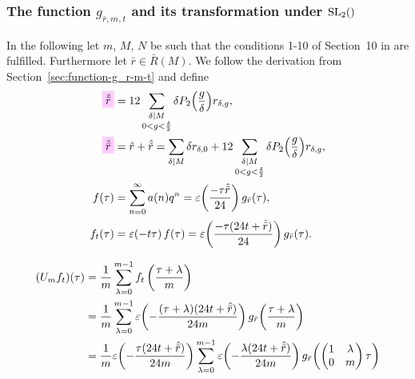 \documentclass{article}
\begin{document}
\subsubsection{The function $g_{\bar{r},m,t}$ and its transformation
  under $\SL2Z$}
\label{sec:function-g_rbar-m-t}

In the following let $m$, $M$, $N$ be such that the conditions 1-10 of
Section~10 in
\cite{Chen+Du+Zhao:FindingModularFunctionsRamanujan:2019} are
fulfilled.
Furthermore let $\bar{r}\in\bar{R}(M)$.
%
We follow the derivation from Section~\ref{sec:function-g_r-m-t} and
define
\begin{align}
  \defineNotation[rtilde^{}]{\sumdelta{\tilde{r}}}
  &=
  12 \sum_{\substack{\divides{\delta}{M}\\0 < g < \frac{\delta}{2}}}
           \delta P_2\Bigl(\frac{g}{\delta}\Bigr) r_{\delta,g},
  \notag\\
  \defineNotation[rbar^{}]{\sumdelta{\bar{r}}}
  &= \sumdelta{r} + \sumdelta{\tilde{r}}
  =
  \divisorsum{M} \delta r_{\delta,0}
  + 12 \sum_{\substack{\divides{\delta}{M}\\0 < g < \frac{\delta}{2}}}
           \delta P_2\Bigl(\frac{g}{\delta}\Bigr) r_{\delta,g},
  \notag\\
  f(\tau)
  &=
  \sum_{n=0}^\infty a(n) q^n
    =
    \unityPower{\frac{- \tau \sumdelta{\bar{r}}}{24}} g_{\bar{r}}(\tau),
  \notag\\
  f_t(\tau)
  &=
    \unityPower{- t \tau} f(\tau)
    =
    \unityPower{\frac{- \tau (24t + \sumdelta{\bar{r}})}{24}} g_{\bar{r}}(\tau).
\end{align}



\begin{align*}
  (U_mf_t)(\tau)
  &=
  \frac{1}{m} \sum_{\lambda=0}^{m-1}f_t\left(\frac{\tau+\lambda}{m}\right)\\
  &=
    \frac{1}{m} \sum_{\lambda=0}^{m-1}
    \varepsilon\!\left(-\frac{(\tau+\lambda) (24 t + \hat{\bar{r}})}{24 m}\right)
    g_{\bar{r}}\!\left(\frac{\tau+\lambda}{m}\right)
  \\
  &=
  \frac{1}{m}
  \varepsilon\!\left(-\frac{\tau (24t+\hat{\bar{r}})}{24m}\right)
  \sum_{\lambda=0}^{m-1}
  \varepsilon\!\left(-\frac{\lambda (24t+\hat{\bar{r}})}{24m}\right)
    g_{\bar{r}}\!
    \left(
    \begin{pmatrix}
      1 & \lambda\\
      0 & m
    \end{pmatrix}
          \tau
    \right)
\end{align*}
\end{document}
